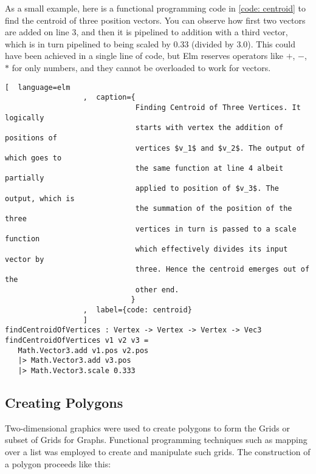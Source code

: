 As a small example, here is a functional programming code in \autoref{code:
centroid} to find the centroid of three position vectors. You can observe
how first two vectors are added on line 3, and then it is pipelined to addition
with a third vector, which is in turn pipelined to being scaled by $0.33$
(divided by $3.0$). This could have been achieved in a single line of code, but
Elm reserves operators like $+$, $-$, $*$ for only numbers, and they cannot be
overloaded to work for vectors.


\begin{lstlisting}[  language=elm
                  ,  caption={
                              Finding Centroid of Three Vertices. It logically
                              starts with vertex the addition of positions of
                              vertices $v_1$ and $v_2$. The output of which goes to
                              the same function at line 4 albeit partially
                              applied to position of $v_3$. The output, which is
                              the summation of the position of the three
                              vertices in turn is passed to a scale function
                              which effectively divides its input vector by
                              three. Hence the centroid emerges out of the
                              other end.
                             }
                  ,  label={code: centroid}
                  ]
findCentroidOfVertices : Vertex -> Vertex -> Vertex -> Vec3
findCentroidOfVertices v1 v2 v3 =
   Math.Vector3.add v1.pos v2.pos
   |> Math.Vector3.add v3.pos
   |> Math.Vector3.scale 0.333
\end{lstlisting}

\subsection{Creating Polygons}
Two-dimensional graphics were used to create polygons to form the Grids
or subset of Grids for Graphs. Functional programming techniques such as mapping
over a list was employed to create and manipulate such grids. 
The construction of a polygon proceeds like this:

